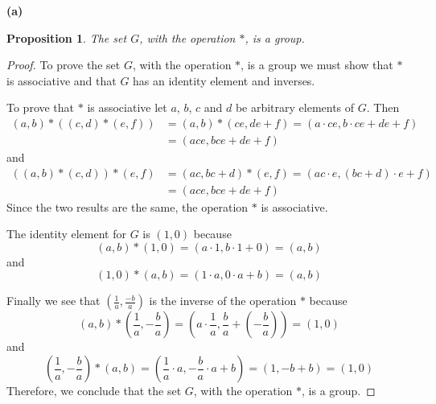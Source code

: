 \documentclass[12pt]{article}   %
\newtheorem*{proposition}{Proposition}  %
\begin{document}
\noindent\textbf{(a)}
\begin{proposition}
The set $G$, with the operation $\ast$, is a group.
\end{proposition}
\begin{proof}
To prove the set $G$, with the operation $\ast$, is a group we must show that $\ast$ is associative and that $G$ has an identity element and inverses.

To prove that $*$ is associative let $a$, $b$, $c$ and $d$ be arbitrary elements of $G$. Then
\begin{align*}
(a,b) * ((c,d) * (e,f)) &= (a,b) * (ce, de + f) = (a \cdot ce, b \cdot ce + de + f) \\
&= (ace, bce + de + f)
\end{align*}
and
\begin{align*}
((a,b)*(c,d)) * (e,f) &= (ac, bc + d) * (e,f) = (ac \cdot e, (bc + d) \cdot e + f) \\
&= (ace, bce + de + f)
\end{align*}
Since the two results are the same, the operation $*$ is associative.

The identity element for $G$ is $(1,0)$ because
\begin{equation*}
(a,b) * (1,0) = (a \cdot 1, b \cdot 1 + 0) = (a,b)
\end{equation*}
and
\begin{equation*}
(1,0) * (a,b) = (1 \cdot a, 0 \cdot a + b) = (a,b)
\end{equation*}

Finally we see that $(\tfrac{1}{a}, \tfrac{-b}{a})$ is the inverse of the operation $\ast$ because
\begin{equation*}
(a,b) * \left( \frac{1}{a}, -\frac{b}{a} \right) = \left( a \cdot \frac{1}{a}, \frac{b}{a} + \left( -\frac{b}{a} \right) \right) = (1,0)
\end{equation*}
and
\begin{equation*}
\left( \frac{1}{a}, -\frac{b}{a} \right) * (a,b) = \left(\frac{1}{a} \cdot a, -\frac{b}{a} \cdot a + b \right) = (1, -b + b) = (1,0)
\end{equation*}
Therefore, we conclude that the set $G$, with the operation $\ast$, is a group.
\end{proof}
\end{document}
